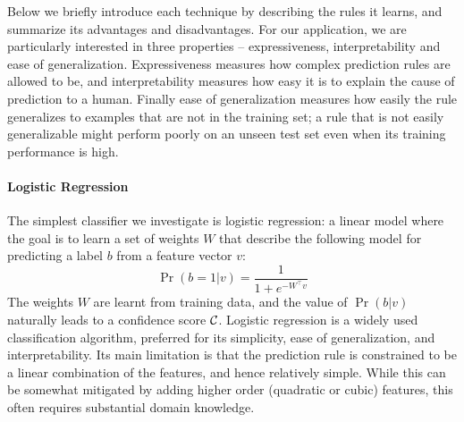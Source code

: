 Below we briefly introduce each technique by describing the rules it
learns, and summarize its advantages and disadvantages.
%
For our application, we are particularly interested in three properties
-- expressiveness, interpretability and ease of generalization.
%
Expressiveness measures how complex prediction rules are allowed to be,
and interpretability measures how easy it is to explain the cause of
prediction to a human.
%
Finally ease of generalization measures how easily the rule generalizes
to examples that are not in the training set; a rule that is not
easily generalizable might perform poorly on an unseen test set even
when its training performance is high.



\paragraph{Logistic Regression}
The simplest classifier we investigate is logistic regression:
a linear model where the goal is to learn a set of weights $W$
that describe the following model for predicting a label
$b$ from a feature vector $v$:
%
\[ \Pr(b = 1 | v) = \frac{1}{1 + e^{-W^{\top} v}} \]
%
The weights $W$ are learnt from training data, and the value of
$\Pr(b | v)$ naturally leads to a confidence score $\mathcal{C}$.
%
Logistic regression is a widely used classification algorithm, preferred
for its simplicity, ease of generalization, and interpretability.
%
Its main limitation is that the prediction rule is constrained to be a
linear combination of the features, and hence relatively simple.
%
While this can be somewhat mitigated by adding higher order (quadratic
or cubic) features, this often requires substantial domain knowledge.

